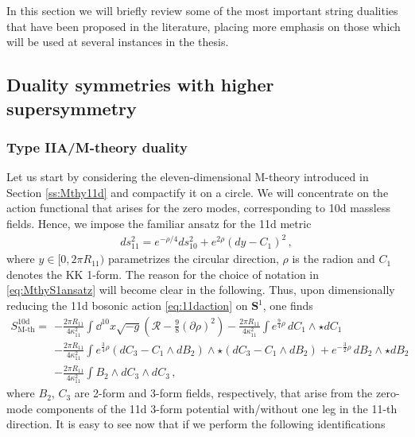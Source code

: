 In this section we will briefly review some of the most important string dualities that have been proposed in the literature, placing more emphasis on those which will be used at several instances in the thesis.

\subsection{Duality symmetries with higher supersymmetry}\label{ss:dualitieswithhighersusy}

\subsubsection*{Type IIA/M-theory duality}

Let us start by considering the eleven-dimensional M-theory introduced in Section \ref{ss:Mthy11d} and compactify it on a circle. We will concentrate on the action functional that arises for the zero modes, corresponding to 10d massless fields. Hence, we impose the familiar ansatz for the 11d metric
%
\begin{align}\label{eq:MthyS1ansatz}
	ds^2_{11} = e^{-\rho/4} ds^2_{10}+ e^{2\rho} (dy-C_1)^2\, ,    
\end{align}
%
where $y \in [0, 2 \pi R_{11})$ parametrizes the circular direction, $\rho$ is the radion and $C_1$ denotes the KK 1-form. The reason for the choice of notation in \eqref{eq:MthyS1ansatz} will become clear in the following. Thus, upon dimensionally reducing the 11d bosonic action \eqref{eq:11daction} on $\mathbf{S}^1$, one finds
%
\begin{equation}
	\label{eq:3formddimgravity}
	\begin{aligned}
		S^{\text{10d}}_{\text{M-th}} = &-\frac{2 \pi R_{11}}{4\kappa_{11}^2} \int \dd^{10}x\sqrt{-g} \left(\mathcal{R}-\frac{9}{8}(\partial \rho)^2\right) - \frac{2 \pi R_{11}}{4\kappa_{11}^2} \int e^{\frac{9}{4}\rho}\, dC_1 \wedge \star dC_1\\
        &- \frac{2 \pi R_{11}}{4\kappa_{11}^2} \int e^{\frac{3}{4}\rho} \left( dC_3-C_1 \wedge dB_2 \right) \wedge \star \left( dC_3-C_1 \wedge dB_2 \right) + e^{-\frac{3}{2}\rho}\, dB_2 \wedge \star dB_2\\
		& - \frac{2 \pi R_{11}}{4\kappa_{11}^2} \int  B_2 \wedge dC_3 \wedge dC_3\, ,
	\end{aligned}
\end{equation}
%
where $B_2$, $C_3$ are 2-form and 3-form fields, respectively, that arise from the zero-mode components of the 11d 3-form potential with/without one leg in the 11-th direction. It is easy to see now that if we perform the following identifications
